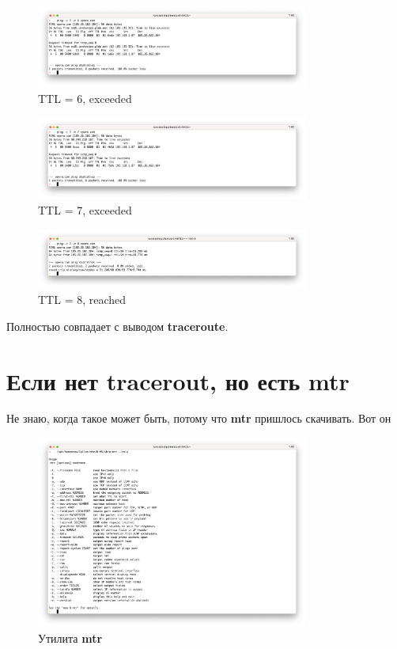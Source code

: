 \documentclass[a4paper]{article}
\begin{document}
  \begin{figure}[H]
    \centering
    \includegraphics[width=0.8\textwidth]{s218}
    \caption{TTL = 6, exceeded}
  \end{figure}
  \begin{figure}[H]
    \centering
    \includegraphics[width=0.8\textwidth]{s219}
    \caption{TTL = 7, exceeded}
  \end{figure}
  \begin{figure}[H]
    \centering
    \includegraphics[width=0.8\textwidth]{s220}
    \caption{TTL = 8, reached}
  \end{figure}

  Полностью совпадает с выводом \textbf{traceroute}.

  \newpage
  \section{Если нет tracerout, но есть mtr}

  Не знаю, когда такое может быть, потому что \textbf{mtr} пришлось скачивать. Вот он
  \begin{figure}[H]
    \centering
    \includegraphics[width=0.8\textwidth]{s221}
    \caption{Утилита \textbf{mtr}}
  \end{figure}
  
\end{document}
